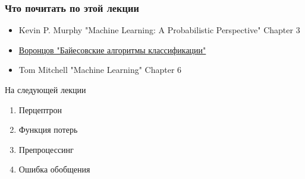 \documentclass[10pt]{beamer}
\begin{document}
\begin{frame}\frametitle{Что почитать по этой лекции}
  \begin{itemize}
    \item Kevin P. Murphy "Machine Learning: A Probabilistic Perspective" Chapter 3
    \item \href{http://www.ccas.ru/voron/download/Bayes.pdf}{Воронцов "Байесовские алгоритмы классификации"}
    \item Tom Mitchell "Machine Learning" Chapter 6
  \end{itemize}
\end{frame}

\begin{frame}{На следующей лекции}
  	\begin{enumerate} [--]
		\item Перцептрон
		\item Функция потерь
		\item Препроцессинг
		\item Ошибка обобщения
	\end{enumerate}
\end{frame}
\end{document}
